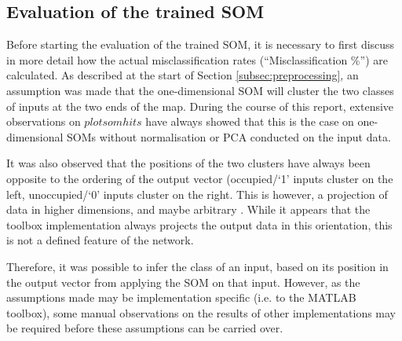 \documentclass[10pt, oneside]{article}
\begin{document}
\subsection{Evaluation of the trained SOM}

Before starting the evaluation of the trained SOM, it is necessary to first discuss in more detail how the actual misclassification rates (``Misclassification \%'') are calculated. As described at the start of Section \ref{subsec:preprocessing}, an assumption was made that the one-dimensional SOM will cluster the two classes of inputs at the two ends of the map. During the course of this report, extensive observations on $plotsomhits$ have always showed that this is the case on one-dimensional SOMs without normalisation or PCA conducted on the input data. 

It was also observed that the positions of the two clusters have always been opposite to the ordering of the output vector (occupied/`1' inputs cluster on the left, unoccupied/`0' inputs cluster on the right. This is however, a projection of data in higher dimensions, and maybe arbitrary \cite[p. 10]{som-app-lecture}. While it appears that the toolbox implementation always projects the output data in this orientation, this is not a defined feature of the network.

Therefore, it was possible to infer the class of an input, based on its position in the output vector from applying the SOM on that input. However, as the assumptions made may be implementation specific (i.e. to the MATLAB toolbox), some manual observations on the results of other implementations may be required before these assumptions can be carried over.


\small{}
\end{document}
